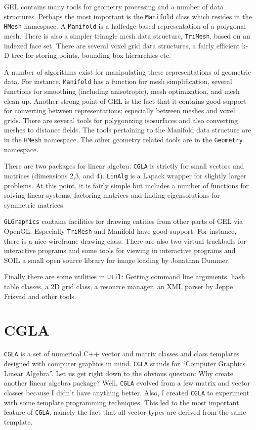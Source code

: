 \documentclass[a4paper]{article}
\begin{document}
GEL contains many tools for geometry processing and a number of data structures. Perhaps the most important is the \texttt{Manifold} class which resides in the \texttt{HMesh} namespace. A \texttt{Manifold} is a halfedge based representation of a polygonal mesh. There is also a simpler triangle mesh data structure, \texttt{TriMesh}, based on an indexed face set. There are several voxel grid data structures, a fairly efficient k-D tree for storing points, bounding box hierarchies etc.

A number of algorithms exist for manipulating these representations of geometric data. For instance, \texttt{Manifold} has a function for mesh simplification, several functions for smoothing (including anisotropic), mesh optimization, and mesh clean up.
Another strong point of GEL is the fact that it contains good support for converting between representations; especially between meshes and voxel grids. There are several tools for polygonizing isosurfaces and also converting meshes to distance fields.  The tools pertaining to the Manifold data structure are in the \texttt{HMesh} namespace. The other geometry related tools are in the \texttt{Geometry} namespace.

There are two packages for linear algebra: \texttt{CGLA} is strictly for small vectors and matrices (dimensions 2,3, and 4). \texttt{LinAlg} is a Lapack wrapper for slightly larger problems. At this point, it is fairly simple but includes a number of functions for solving linear systems, factoring matrices and finding eigensolutions for symmetric matrices.

\texttt{GLGraphics} contains facilities for drawing entities from other parts of GEL via OpenGL. Especially \texttt{TriMesh} and Manifold have good support. For instance, there is a nice wireframe drawing class. There are also two virtual trackballs for interactive programs and some tools for viewing in interactive programs and SOIL a small open source library for image loading by Jonathan Dummer.

Finally there are some utilities in \texttt{Util}: Getting command line arguments, hash table classes, a 2D grid class, a resource manager, an XML parser by Jeppe Frisvad and other tools.
%
%
\section{CGLA}
%
%
\texttt{CGLA} is a set of numerical C++ vector and matrix classes and class
templates designed with computer graphics in mind. \texttt{CGLA} stands for
``Computer Graphics Linear Algebra''. Let us get right down to the obvious question: Why create another
linear algebra package?
Well, \texttt{CGLA} evolved from a few matrix and vector classes because I
didn't have anything better. Also, I created \texttt{CGLA} to experiment with
some template programming techniques. This led to the most important
feature of \texttt{CGLA}, namely the fact that all vector types are derived
from the same template. 
\end{document}
